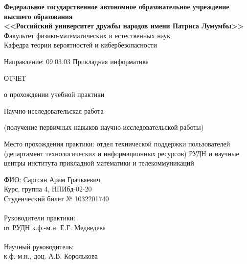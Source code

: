 \begin{titlepage}
  
  \begin{center}
    \textbf{%
      Федеральное государственное автономное образовательное
      учреждение высшего образования\\
      <<Российский университет дружбы народов имени Патриса Лумумбы>>}\\[5mm]
    Факультет физико-математических и естественных наук \\[2mm]
    Кафедра теории вероятностей и кибербезопасности

    \vfill

    
    
    \vfill

    Направление: 09.03.03 Прикладная информатика

    \vfill

    ОТЧЕТ

    \bigskip
    
    о прохождении учебной практики

    Научно-исследовательская работа
    
    (получение первичных навыков научно-исследовательской работы)

    \medskip
    
    Место прохождения практики: отдел технической поддержки
    пользователей (департамент технологических и информационных
    ресурсов) РУДН и научные центры института прикладной математики
    и телекоммуникаций
   
  \end{center}

\vfill

  \begin{minipage}{.45\textwidth}
    ФИО: Саргсян Арам Грачьяевич\\
    Курс, группа 4, НПИбд-02-20\\
    Студенческий билет № 1032201740 \\ \\
    Руководители практики: \\
    от РУДН к.ф.-м.н. Е.Г. Медведева \\ \\
    
    Научный руководитель: \\
    к.ф.-м.н., доц. А.В. Королькова \\ \\


\end{minipage}
\end{titlepage}

